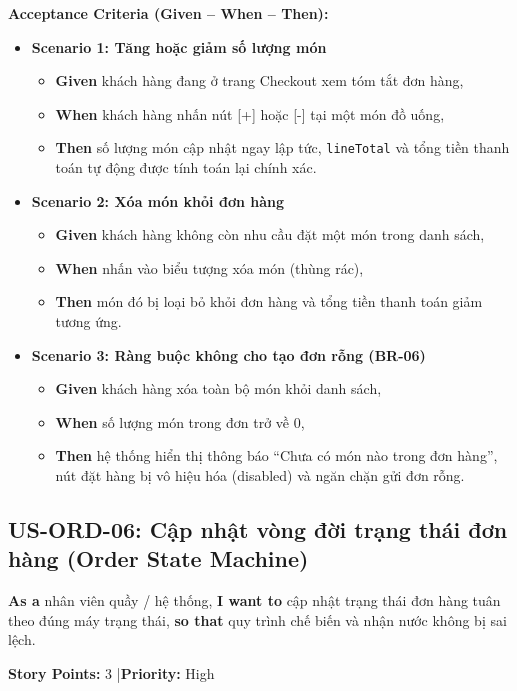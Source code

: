 \documentclass[12pt,a4paper]{article}
\begin{document}
\textbf{Acceptance Criteria (Given -- When -- Then):}
\begin{itemize}
  \item \textbf{Scenario 1: Tăng hoặc giảm số lượng món}
  \begin{itemize}
    \item \textbf{Given} khách hàng đang ở trang Checkout xem tóm tắt đơn hàng,
    \item \textbf{When} khách hàng nhấn nút [+] hoặc [-] tại một món đồ uống,
    \item \textbf{Then} số lượng món cập nhật ngay lập tức, \texttt{lineTotal} và tổng tiền thanh toán tự động được tính toán lại chính xác.
  \end{itemize}
  \item \textbf{Scenario 2: Xóa món khỏi đơn hàng}
  \begin{itemize}
    \item \textbf{Given} khách hàng không còn nhu cầu đặt một món trong danh sách,
    \item \textbf{When} nhấn vào biểu tượng xóa món (thùng rác),
    \item \textbf{Then} món đó bị loại bỏ khỏi đơn hàng và tổng tiền thanh toán giảm tương ứng.
  \end{itemize}
  \item \textbf{Scenario 3: Ràng buộc không cho tạo đơn rỗng (BR-06)}
  \begin{itemize}
    \item \textbf{Given} khách hàng xóa toàn bộ món khỏi danh sách,
    \item \textbf{When} số lượng món trong đơn trở về 0,
    \item \textbf{Then} hệ thống hiển thị thông báo ``Chưa có món nào trong đơn hàng'', nút đặt hàng bị vô hiệu hóa (disabled) và ngăn chặn gửi đơn rỗng.
  \end{itemize}
\end{itemize}

\subsection{US-ORD-06: Cập nhật vòng đời trạng thái đơn hàng (Order State Machine)}

\textbf{As a} nhân viên quầy / hệ thống, \textbf{I want to} cập nhật trạng thái đơn hàng tuân theo đúng máy trạng thái, \textbf{so that} quy trình chế biến và nhận nước không bị sai lệch.

\textbf{Story Points:} 3 \quad|\quad \textbf{Priority:} High
\end{document}
